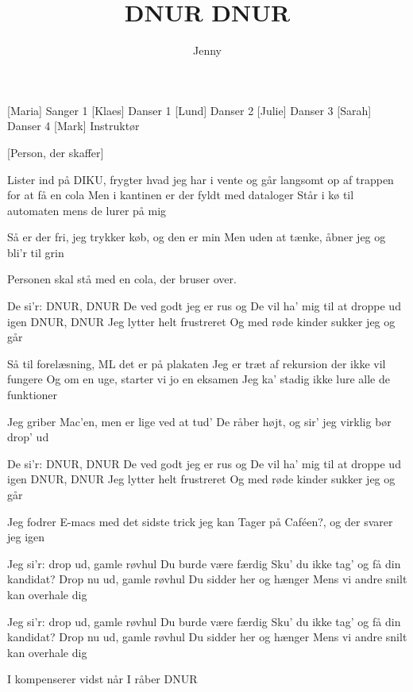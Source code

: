 \documentclass[a4paper,11pt]{article}
\title{DNUR DNUR}
\author{Jenny}
\begin{document}
\maketitle

\begin{roles}
[Maria] Sanger 1
[Klaes] Danser 1
[Lund] Danser 2
[Julie] Danser 3
[Sarah] Danser 4
[Mark] Instruktør
\end{roles}

\begin{props}
[Person, der skaffer]
\end{props}

\begin{song}

 Lister ind på DIKU, frygter hvad jeg har i vente
og går langsomt op af trappen for at få en cola
Men i kantinen er der fyldt med dataloger
Står i kø til automaten mens de lurer på mig

Så er der fri, jeg trykker køb, og den er min
Men uden at tænke, åbner jeg og bli'r til grin

\scene Personen skal stå med en cola, der bruser over.

 De si'r: DNUR, DNUR
De ved godt jeg er rus og
De vil ha' mig til at droppe ud igen
DNUR, DNUR
Jeg lytter helt frustreret 
Og med røde kinder sukker jeg og går 

Så til forelæsning, ML det er på plakaten
Jeg er træt af rekursion der ikke vil fungere
Og om en uge, starter vi jo en eksamen 
Jeg ka' stadig ikke lure alle de funktioner

Jeg griber Mac'en, men er lige ved at tud'
De råber højt, og sir' jeg virklig bør drop' ud

De si'r: DNUR, DNUR
De ved godt jeg er rus og
De vil ha' mig til at droppe ud igen
DNUR, DNUR
Jeg lytter helt frustreret 
Og med røde kinder sukker jeg og går

Jeg fodrer E-macs med det sidste trick jeg kan
Tager på Caféen?, og der svarer jeg igen

Jeg si'r: drop ud, gamle røvhul
Du burde være færdig
Sku' du ikke tag' og få din kandidat?
Drop nu ud, gamle røvhul
Du sidder her og hænger
Mens vi andre snilt kan overhale dig

Jeg si'r: drop ud, gamle røvhul
Du burde være færdig
Sku' du ikke tag' og få din kandidat?
Drop nu ud, gamle røvhul
Du sidder her og hænger
Mens vi andre snilt kan overhale dig

I kompenserer vidst når I råber DNUR

\end{song}
\end{document}
